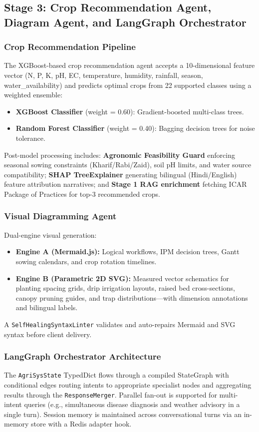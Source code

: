 \documentclass[12pt,a4paper]{article}
\begin{document}
\subsection{Stage 3: Crop Recommendation Agent, Diagram Agent, and LangGraph Orchestrator}

\subsubsection{Crop Recommendation Pipeline}
The XGBoost-based crop recommendation agent accepts a 10-dimensional feature vector (N, P, K, pH, EC, temperature, humidity, rainfall, season, water\_availability) and predicts optimal crops from 22 supported classes using a weighted ensemble:
\begin{itemize}
\item \textbf{XGBoost Classifier} (weight = 0.60): Gradient-boosted multi-class trees.
\item \textbf{Random Forest Classifier} (weight = 0.40): Bagging decision trees for noise tolerance.
\end{itemize}
Post-model processing includes: \textbf{Agronomic Feasibility Guard} enforcing seasonal sowing constraints (Kharif/Rabi/Zaid), soil pH limits, and water source compatibility; \textbf{SHAP TreeExplainer} generating bilingual (Hindi/English) feature attribution narratives; and \textbf{Stage 1 RAG enrichment} fetching ICAR Package of Practices for top-3 recommended crops.

\subsubsection{Visual Diagramming Agent}
Dual-engine visual generation:
\begin{itemize}
\item \textbf{Engine A (Mermaid.js):} Logical workflows, IPM decision trees, Gantt sowing calendars, and crop rotation timelines.
\item \textbf{Engine B (Parametric 2D SVG):} Measured vector schematics for planting spacing grids, drip irrigation layouts, raised bed cross-sections, canopy pruning guides, and trap distributions---with dimension annotations and bilingual labels.
\end{itemize}
A \texttt{SelfHealingSyntaxLinter} validates and auto-repairs Mermaid and SVG syntax before client delivery.

\subsubsection{LangGraph Orchestrator Architecture}
The \texttt{AgriSysState} TypedDict flows through a compiled StateGraph with conditional edges routing intents to appropriate specialist nodes and aggregating results through the \texttt{ResponseMerger}. Parallel fan-out is supported for multi-intent queries (e.g., simultaneous disease diagnosis and weather advisory in a single turn). Session memory is maintained across conversational turns via an in-memory store with a Redis adapter hook.
\end{document}
